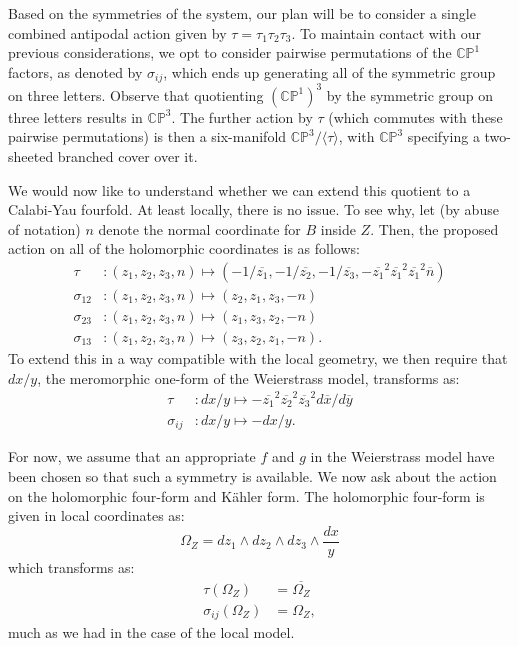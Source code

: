 \documentclass[12pt]{article}%
\numberwithin{equation}{section}
\renewcommand{\(}{\left(}
\renewcommand{\)}{\right)}
\renewcommand{\[}{\left[}
\renewcommand{\]}{\right]}
\begin{document}
Based on the symmetries of the system, our plan will be to consider a single
combined antipodal action given by $\tau=\tau_{1}\tau_{2}\tau_{3}$. To
maintain contact with our previous considerations, we opt to consider pairwise
permutations of the $\mathbb{CP}^{1}$ factors, as denoted by $\sigma_{ij}$, which ends up generating
all of the symmetric group on three letters. Observe that quotienting $(\mathbb{CP}^{1})^3$ by the symmetric group on three
letters results in $\mathbb{CP}^3$. The further action by $\tau$ (which commutes with these pairwise permutations) is then a six-manifold
$\mathbb{CP}^3 / \langle \tau \rangle$, with $\mathbb{CP}^3$ specifying a two-sheeted branched cover over it.

We would now like to understand whether we can extend this quotient to a Calabi-Yau fourfold.
At least locally, there is no issue. To see why, let (by abuse of notation)
$n$ denote the normal coordinate for $B$ inside $Z$. Then, the proposed action
on all of the holomorphic coordinates is as follows:%
\begin{align}
\tau & :(z_{1},z_{2},z_{3},n)\mapsto(-1/\overline{z_{1}},-1/\overline{z_{2}%
},-1/\overline{z_{3}},-\overline{z_{1}}^{2}\overline{z_{1}}^{2}\overline
{z_{1}}^{2}\overline{n})\\
\sigma_{12}  & :(z_{1},z_{2},z_{3},n)\mapsto(z_{2},z_{1},z_{3},-n)\\
\sigma_{23}  & :(z_{1},z_{2},z_{3},n)\mapsto(z_{1},z_{3},z_{2},-n)\\
\sigma_{13}  & :(z_{1},z_{2},z_{3},n)\mapsto(z_{3},z_{2},z_{1},-n).
\end{align}
To extend this in a way compatible with the local geometry, we then require
that $dx /y$, the meromorphic one-form of the Weierstrass model, transforms as:
\begin{align}
\tau & :dx/y\mapsto-\overline{z_{1}}^{2}\overline{z_{2}}^{2}\overline{z_{3}%
}^{2}d\overline{x}/d\overline{y}\\
\sigma_{ij}  & :dx/y\mapsto-dx/y.
\end{align}


For now, we assume that an appropriate $f$ and $g$ in the Weierstrass model
have been chosen so that such a symmetry is available. We now ask about
the action on the holomorphic four-form and K\"ahler form. The
holomorphic four-form is given in local coordinates as:%
\begin{equation}
\Omega_{Z}=dz_{1}\wedge dz_{2}\wedge dz_{3}\wedge\frac{dx}{y}%
\end{equation}
which transforms as:%
\begin{align}
\tau(\Omega_{Z})  & =\overline{\Omega_{Z}}\\
\sigma_{ij}(\Omega_{Z})  & =\Omega_{Z},
\end{align}
much as we had in the case of the local model.
\end{document}
